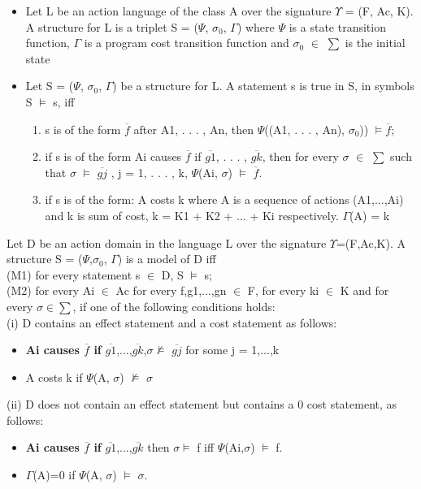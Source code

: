 \documentclass[11pt]{article}
\begin{document}
\begin{itemize}
\item 	Let L be an action language of the class A over the signature $\Upsilon$ = (F, Ac, K). A structure for L is a triplet S = ($\Psi$, $\sigma_{0}$, $\Gamma$) where $\Psi$ is a state transition function, $\Gamma$ is a program cost transition function  and $\sigma_{0}$ $\in$ $\sum$ is the initial state

\item 	Let S = ($\Psi$, $\sigma_{0}$, $\Gamma$) be a structure for L. A statement s is true in S, in symbols S   $\vDash$   s, iff 
\begin{enumerate}
\item s is of the form $\overline{f}$ after A1, . . . , An, then $\Psi$((A1, . . . , An), $\sigma_{0}$))   $\vDash \overline{f}$;

\item if s is of the form Ai causes $\overline{f}$ if $\overline{g1}$, . . . , $\overline{gk}$, then for every $\sigma$ $\in$ $\sum$ such that $\sigma$   $\vDash$   $\overline{gj}$ , j = 1, . . . , k, $\Psi$(Ai, $\sigma$)   $\vDash$   $\overline{f}$.

\item if s is of the form: A costs k where A is a sequence of actions (A1,...,Ai) and k is sum of cost, k = K1 + K2 + ... + Ki respectively. $\Gamma$(A) = k
\end{enumerate}
 

\end{itemize}
Let D be an action domain in the language L over the signature $\Upsilon$=(F,Ac,K). A structure S = ($\Psi$,$\sigma_{0}$, $\Gamma$) is a model of D iff\\
(M1) for every statement s $\in$ D, S $\vDash$ s;\\
(M2) for every Ai $\in$ Ac for every f,g1,...,gn $\in$ F, for every ki $\in$ K and for every $\sigma\in\sum$, if one of the following conditions holds:
\\
(i) D contains an effect statement and a cost statement as follows:
\begin{itemize}
	\item {\bfseries Ai causes $\overline{f}$ if} $\overline{g1}$,...,$\overline{gk}$,$\sigma \nvDash$  $\overline{gj}$ for some j = 1,...,k

	\item A costs k if $\Psi$(A, $\sigma$) $\nvDash$ $\sigma$
\end{itemize}
(ii) D does not contain an effect statement but contains a 0 cost statement, as follows:
\begin{itemize}
\item {\bfseries Ai causes $\overline{f}$ if} $\overline{g1}$,...,$\overline{gk}$ then $\sigma \vDash$ f iff $\Psi$(Ai,$\sigma$) $\vDash$ f.

\item $\Gamma$(A)=0 if $\Psi$(A, $\sigma$) $\vDash$ $\sigma$.
\end{itemize}
\end{document}
